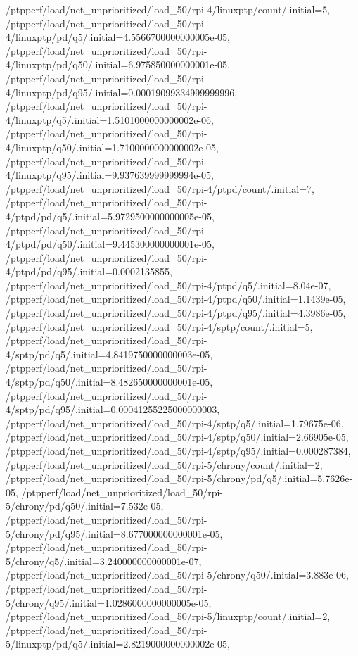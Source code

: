 {    /ptpperf/load/net_unprioritized/load_50/rpi-4/linuxptp/count/.initial=5,
    /ptpperf/load/net_unprioritized/load_50/rpi-4/linuxptp/pd/q5/.initial=4.5566700000000005e-05,
    /ptpperf/load/net_unprioritized/load_50/rpi-4/linuxptp/pd/q50/.initial=6.975850000000001e-05,
    /ptpperf/load/net_unprioritized/load_50/rpi-4/linuxptp/pd/q95/.initial=0.00019099334999999996,
    /ptpperf/load/net_unprioritized/load_50/rpi-4/linuxptp/q5/.initial=1.5101000000000002e-06,
    /ptpperf/load/net_unprioritized/load_50/rpi-4/linuxptp/q50/.initial=1.7100000000000002e-05,
    /ptpperf/load/net_unprioritized/load_50/rpi-4/linuxptp/q95/.initial=9.937639999999994e-05,
    /ptpperf/load/net_unprioritized/load_50/rpi-4/ptpd/count/.initial=7,
    /ptpperf/load/net_unprioritized/load_50/rpi-4/ptpd/pd/q5/.initial=5.9729500000000005e-05,
    /ptpperf/load/net_unprioritized/load_50/rpi-4/ptpd/pd/q50/.initial=9.445300000000001e-05,
    /ptpperf/load/net_unprioritized/load_50/rpi-4/ptpd/pd/q95/.initial=0.0002135855,
    /ptpperf/load/net_unprioritized/load_50/rpi-4/ptpd/q5/.initial=8.04e-07,
    /ptpperf/load/net_unprioritized/load_50/rpi-4/ptpd/q50/.initial=1.1439e-05,
    /ptpperf/load/net_unprioritized/load_50/rpi-4/ptpd/q95/.initial=4.3986e-05,
    /ptpperf/load/net_unprioritized/load_50/rpi-4/sptp/count/.initial=5,
    /ptpperf/load/net_unprioritized/load_50/rpi-4/sptp/pd/q5/.initial=4.8419750000000003e-05,
    /ptpperf/load/net_unprioritized/load_50/rpi-4/sptp/pd/q50/.initial=8.482650000000001e-05,
    /ptpperf/load/net_unprioritized/load_50/rpi-4/sptp/pd/q95/.initial=0.00041255225000000003,
    /ptpperf/load/net_unprioritized/load_50/rpi-4/sptp/q5/.initial=1.79675e-06,
    /ptpperf/load/net_unprioritized/load_50/rpi-4/sptp/q50/.initial=2.66905e-05,
    /ptpperf/load/net_unprioritized/load_50/rpi-4/sptp/q95/.initial=0.000287384,
    /ptpperf/load/net_unprioritized/load_50/rpi-5/chrony/count/.initial=2,
    /ptpperf/load/net_unprioritized/load_50/rpi-5/chrony/pd/q5/.initial=5.7626e-05,
    /ptpperf/load/net_unprioritized/load_50/rpi-5/chrony/pd/q50/.initial=7.532e-05,
    /ptpperf/load/net_unprioritized/load_50/rpi-5/chrony/pd/q95/.initial=8.677000000000001e-05,
    /ptpperf/load/net_unprioritized/load_50/rpi-5/chrony/q5/.initial=3.240000000000001e-07,
    /ptpperf/load/net_unprioritized/load_50/rpi-5/chrony/q50/.initial=3.883e-06,
    /ptpperf/load/net_unprioritized/load_50/rpi-5/chrony/q95/.initial=1.0286000000000005e-05,
    /ptpperf/load/net_unprioritized/load_50/rpi-5/linuxptp/count/.initial=2,
    /ptpperf/load/net_unprioritized/load_50/rpi-5/linuxptp/pd/q5/.initial=2.8219000000000002e-05,
}
